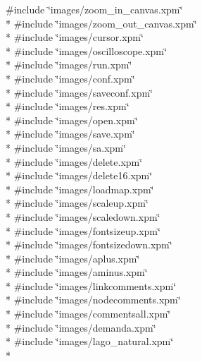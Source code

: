 {\ttfamily \#include \char`\"{}images/zoom\+\_\+in\+\_\+canvas.\+xpm\char`\"{}}\\*
{\ttfamily \#include \char`\"{}images/zoom\+\_\+out\+\_\+canvas.\+xpm\char`\"{}}\\*
{\ttfamily \#include \char`\"{}images/cursor.\+xpm\char`\"{}}\\*
{\ttfamily \#include \char`\"{}images/oscilloscope.\+xpm\char`\"{}}\\*
{\ttfamily \#include \char`\"{}images/run.\+xpm\char`\"{}}\\*
{\ttfamily \#include \char`\"{}images/conf.\+xpm\char`\"{}}\\*
{\ttfamily \#include \char`\"{}images/saveconf.\+xpm\char`\"{}}\\*
{\ttfamily \#include \char`\"{}images/res.\+xpm\char`\"{}}\\*
{\ttfamily \#include \char`\"{}images/open.\+xpm\char`\"{}}\\*
{\ttfamily \#include \char`\"{}images/save.\+xpm\char`\"{}}\\*
{\ttfamily \#include \char`\"{}images/sa.\+xpm\char`\"{}}\\*
{\ttfamily \#include \char`\"{}images/delete.\+xpm\char`\"{}}\\*
{\ttfamily \#include \char`\"{}images/delete16.\+xpm\char`\"{}}\\*
{\ttfamily \#include \char`\"{}images/loadmap.\+xpm\char`\"{}}\\*
{\ttfamily \#include \char`\"{}images/scaleup.\+xpm\char`\"{}}\\*
{\ttfamily \#include \char`\"{}images/scaledown.\+xpm\char`\"{}}\\*
{\ttfamily \#include \char`\"{}images/fontsizeup.\+xpm\char`\"{}}\\*
{\ttfamily \#include \char`\"{}images/fontsizedown.\+xpm\char`\"{}}\\*
{\ttfamily \#include \char`\"{}images/aplus.\+xpm\char`\"{}}\\*
{\ttfamily \#include \char`\"{}images/aminus.\+xpm\char`\"{}}\\*
{\ttfamily \#include \char`\"{}images/linkcomments.\+xpm\char`\"{}}\\*
{\ttfamily \#include \char`\"{}images/nodecomments.\+xpm\char`\"{}}\\*
{\ttfamily \#include \char`\"{}images/commentsall.\+xpm\char`\"{}}\\*
{\ttfamily \#include \char`\"{}images/demanda.\+xpm\char`\"{}}\\*
{\ttfamily \#include \char`\"{}images/lago\+\_\+natural.\+xpm\char`\"{}}\\*
